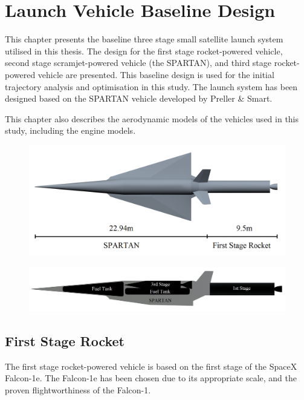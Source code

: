 
\cleardoublepage
\chapter{Launch Vehicle Baseline Design}\label{chapter:methodology}

This chapter presents the baseline three stage small satellite launch system utilised in this thesis. The design for the first stage rocket-powered vehicle, second stage scramjet-powered vehicle (the SPARTAN), and third stage rocket-powered vehicle are presented. This baseline design is used for the initial trajectory analysis and optimisation in this study. The launch system has been designed based on the SPARTAN vehicle developed by Preller \& Smart.

This chapter also describes the aerodynamic models of the vehicles used in this study, including the engine models.


\begin{figure}
\centering
\includegraphics[width=0.7\linewidth]{figures/3_vehicle_design/NoInternal}
\caption{}
\label{fig:NoInternal}
\end{figure}

\begin{figure}
\centering
\includegraphics[width=0.7\linewidth]{figures/3_vehicle_design/INTERNALS}
\caption{}
\label{fig:INTERNALS}
\end{figure}


\section{First Stage Rocket}
The first stage rocket-powered vehicle is based on the first stage of the SpaceX Falcon-1e. The Falcon-1e has been chosen due to its appropriate scale, and the proven flightworthiness of the Falcon-1.

